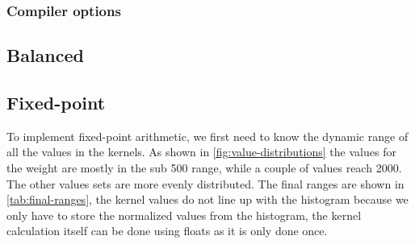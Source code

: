 \documentclass[final]{article}
\begin{document}
\subsubsection{Compiler options}


\subsection{Balanced}

\subsection{Fixed-point}
To implement fixed-point arithmetic, we first need to know the dynamic range of all the values in the kernels.
As shown in \cref{fig:value-distributions} the values for the weight are mostly in the sub \num{500} range, while a couple of values reach \num{2000}.
The other values sets are more evenly distributed.
The final ranges are shown in \cref{tab:final-ranges}, the kernel values do not line up with the histogram because we only have to store the normalized values from the histogram, the kernel calculation itself can be done using floats as it is only done once.
\end{document}
